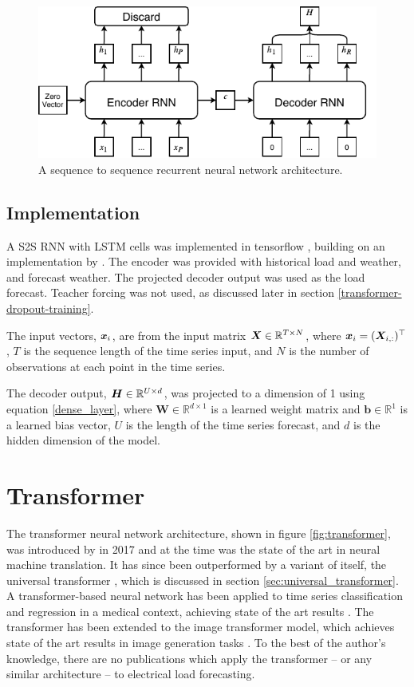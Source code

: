 \begin{figure}[htbp]
	\centerline{\includegraphics[trim=0 0cm 0 0, width=.75\textwidth]{images/S2S.pdf}}
	\caption{A sequence to sequence recurrent neural network architecture.}
	\label{fig:S2S}
\end{figure}

\subsection{Implementation}
A S2S RNN with LSTM cells was implemented in tensorflow \cite{tensorflow2015-whitepaper}, building on an implementation by \citet{Chevalier2017}.
The encoder was provided with historical load and weather, and forecast weather.
The projected decoder output was used as the load forecast.
Teacher forcing was not used, as discussed later in section \ref{transformer-dropout-training}.

The input vectors, ${\bm{x}}_i$, are from the input matrix ${\bm{X}} \in \mathbb{R}^{T \times N}$, where ${\bm{x}}_i = ({\bm{X}}_{i,:})^\top$, $T$ is the sequence length of the time series input, and $N$ is the number of observations at each point in the time series.

The decoder output, ${\bm{H}} \in \mathbb{R}^{U \times d}$, was projected to a dimension of 1 using equation \ref{dense_layer}, where $\boldsymbol{W} \in \mathbb{R}^{d \times 1}$ is a learned weight matrix and $\boldsymbol{b} \in \mathbb{R}^{1}$ is a learned bias vector, $U$ is the length of the time series forecast, and $d$ is the hidden dimension of the model.

\section{Transformer} \label{sec:transformer}
The transformer neural network architecture, shown in figure \ref{fig:transformer}, was introduced by \citet{Vaswani2017} in 2017 and at the time was the state of the art in neural machine translation.
It has since been outperformed by a variant of itself, the universal transformer \cite{Dehghani2018}, which is discussed in section \ref{sec:universal_transformer}.
A transformer-based neural network has been applied to time series classification and regression in a medical context, achieving state of the art results \cite{Song2017}.
The transformer has been extended to the image transformer model, which achieves state of the art results in image generation tasks \cite{Parmar2018}.
To the best of the author's knowledge, there are no publications which apply the transformer -- or any similar architecture -- to electrical load forecasting.


